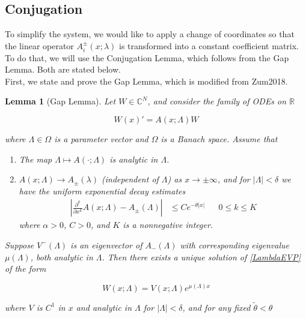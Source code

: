 \documentclass[12pt]{article}
\def\R{{\mathbb R}}
\def\C{{\mathbb C}}
\newtheorem{lemma}{Lemma}
\begin{document}
\subsection{Conjugation}

To simplify the system, we would like to apply a change of coordinates so that the linear operator $A_i^\pm(x; \lambda)$ is transformed into a constant coefficient matrix. To do that, we will use the Conjugation Lemma, which follows from the Gap Lemma. Both are stated below.\\

First, we state and prove the Gap Lemma, which is modified from Zum2018. 

\begin{lemma}[Gap Lemma]\label{gaplemma}
Let $W \in \C^N$, and consider the family of ODEs on $\R$

\begin{equation}\label{LambdaEVP}
W(x)' = A(x; \Lambda) W
\end{equation}

where $\Lambda \in \Omega$ is a parameter vector and $\Omega$ is a Banach space. Assume that

\begin{enumerate}
	\item The map $\Lambda \mapsto A(\cdot; \Lambda)$ is analytic in $\Lambda$.
	\item $A(x; \Lambda) \rightarrow A_\pm(\lambda)$ (independent of $\Lambda$) as $x \rightarrow \pm \infty$, and for $|\Lambda| < \delta$ we have the uniform exponential decay estimates 
	\begin{align}
	\left| \frac{\partial^k}{\partial x^k} A(x; \Lambda) - A_\pm(\Lambda) \right| 
	&\leq C e^{-\theta |x|} && 0 \leq k \leq K
	\end{align}
	where $\alpha > 0$, $C > 0$, and $K$ is a nonnegative integer.
\end{enumerate}

Suppose $V^-(\Lambda)$ is an eigenvector of $A_-(\Lambda)$ with corresponding eigenvalue $\mu(\Lambda)$, both analytic in $\Lambda$. Then there exists a unique solution of \ref{LambdaEVP} of the form 

\begin{equation}
W(x; \Lambda) = V(x; \Lambda) e^{\mu(\Lambda)x}
\end{equation}

where $V$ is $C^1$ in $x$ and analytic in $\Lambda$ for $|\Lambda| < \delta$, and for any fixed $\tilde{\theta} < \theta$


\end{lemma}
\end{document}
